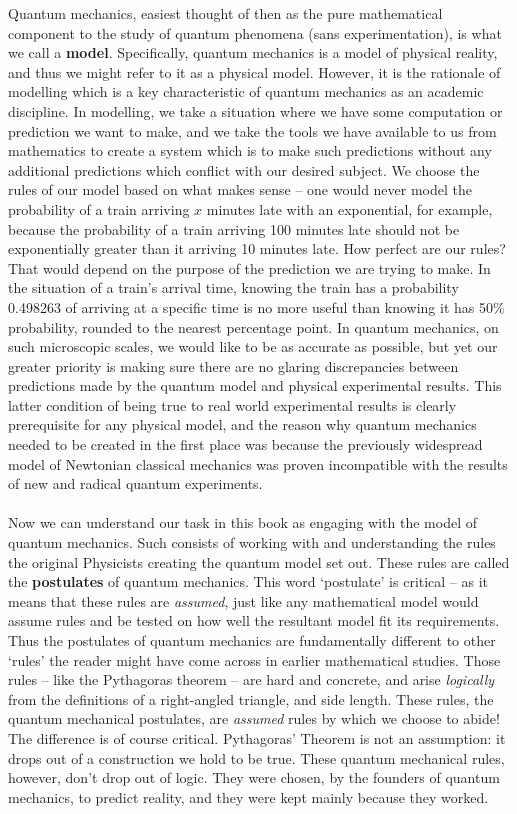 Quantum mechanics, easiest thought of then as the pure mathematical component to the study of quantum phenomena (sans experimentation), is what we call a \textbf{model}. Specifically, quantum mechanics is a model of physical reality, and thus we might refer to it as a physical model. However, it is the rationale of modelling which is a key characteristic of quantum mechanics as an academic discipline. In modelling, we take a situation where we have some computation or prediction we want to make, and we take the tools we have available to us from mathematics to create a system which is to make such predictions without any additional predictions which conflict with our desired subject. We choose the rules of our model based on what makes sense -- one would never model the probability of a train arriving $x$ minutes late with an exponential, for example, because the probability of a train arriving 100 minutes late should not be exponentially greater than it arriving 10 minutes late. How perfect are our rules? That would depend on the purpose of the prediction we are trying to make. In the situation of a train's arrival time, knowing the train has a probability 0.498263 of arriving at a specific time is no more useful than knowing it has 50\% probability, rounded to the nearest percentage point. In quantum mechanics, on such microscopic scales, we would like to be as accurate as possible, but yet our greater priority is making sure there are no glaring discrepancies between predictions made by the quantum model and physical experimental results. This latter condition of being true to real world experimental results is clearly prerequisite for any physical model, and the reason why quantum mechanics needed to be created in the first place was because the previously widespread model of Newtonian classical mechanics was proven incompatible with the results of new and radical quantum experiments.
\\\\
Now we can understand our task in this book as engaging with the model of quantum mechanics. Such consists of working with and understanding the rules the original Physicists creating the quantum model set out. These rules are called the \textbf{postulates} of quantum mechanics. This word `postulate' is critical -- as it means that these rules are \textit{assumed}, just like any mathematical model would assume rules and be tested on how well the resultant model fit its requirements. Thus the postulates of quantum mechanics are fundamentally different to other `rules' the reader might have come across in earlier mathematical studies. Those rules -- like the Pythagoras theorem -- are hard and concrete, and arise \textit{logically} from the definitions of a right-angled triangle, and side length. These rules, the quantum mechanical postulates, are \textit{assumed} rules by which we choose to abide! The difference is of course critical. Pythagoras' Theorem is not an assumption: it drops out of a construction we hold to be true. These quantum mechanical rules, however, don't drop out of logic. They were chosen, by the founders of quantum mechanics, to predict reality, and they were kept mainly because they worked.
